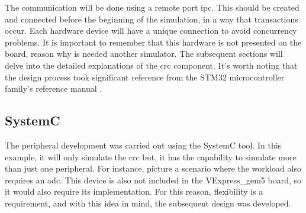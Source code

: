 The communication will be done using a remote port \gls{ipc}. This should be created and connected before the beginning of the
simulation, in a way that transactions occur. Each hardware device will have a unique connection to avoid concurrency problems.
It is important to remember that this hardware is not presented on the board, reason why is needed another simulator. The subsequent sections 
will delve into the detailed explanations of the \gls{crc} component. It's worth noting that the design process 
took significant reference from the STM32 microcontroller family's reference manual \cite{referenceManualRM0385}.


\subsection{SystemC}

The peripheral development was carried out using the SystemC tool. In this example, it will only simulate the \gls{crc} but, it has
the capability to simulate more than just one peripheral. For instance, picture a scenario where the workload also requires an \gls{adc}.
This device is also not included in the VExpress\_gem5 board, so it would also require its implementation. For this reason, flexibility
is a requirement, and with this idea in mind, the subsequent design was developed.


